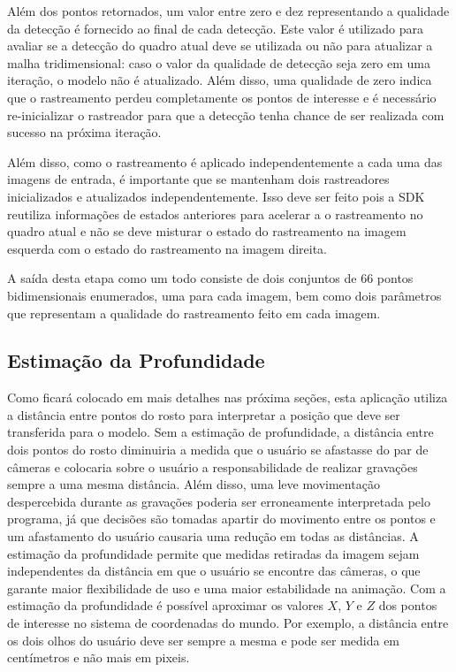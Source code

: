 Além dos pontos retornados, um valor entre zero e dez representando a qualidade da detecção é fornecido ao final de cada detecção. Este valor é utilizado para avaliar se a detecção do quadro atual deve se utilizada ou não para atualizar a malha tridimensional: caso o valor da qualidade de detecção seja zero em uma iteração, o modelo não é atualizado. Além disso, uma qualidade de zero indica que o rastreamento perdeu completamente os pontos de interesse e é necessário re-inicializar o rastreador para que a detecção tenha chance de ser realizada com sucesso na próxima iteração.

Além disso, como o rastreamento é aplicado independentemente a cada uma das imagens de entrada, é importante que se mantenham dois rastreadores inicializados e atualizados independentemente. Isso deve ser feito pois a SDK reutiliza informações de estados anteriores para acelerar a o rastreamento no quadro atual e não se deve misturar o estado do rastreamento na imagem esquerda com o estado do rastreamento na imagem direita. 

A saída desta etapa como um todo consiste de dois conjuntos de 66 pontos bidimensionais enumerados, uma para cada imagem, bem como dois parâmetros que representam a qualidade do rastreamento feito em cada imagem. 

\subsection{Estimação da Profundidade}

Como ficará colocado em mais detalhes nas próxima seções, esta aplicação utiliza a distância entre pontos do rosto para interpretar a posição que deve ser transferida para o modelo. Sem a estimação de profundidade, a distância entre dois pontos do rosto diminuiria a medida que o usuário se afastasse do par de câmeras e colocaria sobre o usuário a responsabilidade de realizar gravações sempre a uma mesma distância. Além disso, uma leve movimentação despercebida durante as gravações poderia ser erroneamente interpretada pelo programa, já que decisões são tomadas apartir do movimento entre os pontos e um afastamento do usuário causaria uma redução em todas as distâncias.
A estimação da profundidade permite que medidas retiradas da imagem sejam independentes da distância em que o usuário se encontre das câmeras, o que garante maior flexibilidade de uso e uma maior estabilidade na animação. Com a estimação da profundidade é possível aproximar os valores $X$, $Y$ e $Z$ dos pontos de interesse no sistema de coordenadas do mundo. Por exemplo, a distância entre os dois olhos do usuário deve ser sempre a mesma e pode ser medida em centímetros e não mais em pixeis.

